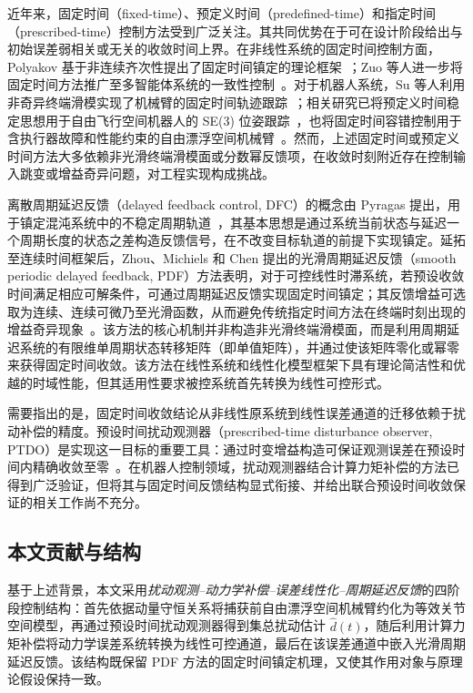 近年来，固定时间（fixed-time）、预定义时间（predefined-time）和指定时间（prescribed-time）控制方法受到广泛关注。其共同优势在于可在设计阶段给出与初始误差弱相关或无关的收敛时间上界。在非线性系统的固定时间控制方面，Polyakov 基于非连续齐次性提出了固定时间镇定的理论框架~\cite{polyakov2012}；Zuo 等人进一步将固定时间方法推广至多智能体系统的一致性控制~\cite{zuo2019}。对于机器人系统，Su 等人利用非奇异终端滑模实现了机械臂的固定时间轨迹跟踪~\cite{su2020}；相关研究已将预定义时间稳定思想用于自由飞行空间机器人的 SE(3) 位姿跟踪~\cite{xuPredefinedTimeTrackingControl2024}，也将固定时间容错控制用于含执行器故障和性能约束的自由漂浮空间机械臂~\cite{li2025}。然而，上述固定时间或预定义时间方法大多依赖非光滑终端滑模面或分数幂反馈项，在收敛时刻附近存在控制输入跳变或增益奇异问题，对工程实现构成挑战。

离散周期延迟反馈（delayed feedback control, DFC）的概念由 Pyragas 提出，用于镇定混沌系统中的不稳定周期轨道~\cite{pyragas1992}，其基本思想是通过系统当前状态与延迟一个周期长度的状态之差构造反馈信号，在不改变目标轨道的前提下实现镇定。延拓至连续时间框架后，Zhou、Michiels 和 Chen 提出的光滑周期延迟反馈（smooth periodic delayed feedback, PDF）方法表明，对于可控线性时滞系统，若预设收敛时间满足相应可解条件，可通过周期延迟反馈实现固定时间镇定；其反馈增益可选取为连续、连续可微乃至光滑函数，从而避免传统指定时间方法在终端时刻出现的增益奇异现象~\cite{zhouFixedtimeStabilizationLinear2022}。该方法的核心机制并非构造非光滑终端滑模面，而是利用周期延迟系统的有限维单周期状态转移矩阵（即单值矩阵），并通过使该矩阵零化或幂零来获得固定时间收敛。该方法在线性系统和线性化模型框架下具有理论简洁性和优越的时域性能，但其适用性要求被控系统首先转换为线性可控形式。

需要指出的是，固定时间收敛结论从非线性原系统到线性误差通道的迁移依赖于扰动补偿的精度。预设时间扰动观测器（prescribed-time disturbance observer, PTDO）是实现这一目标的重要工具：通过时变增益构造可保证观测误差在预设时间内精确收敛至零~\cite{jiangPrescribedtimeDisturbanceObserver2024}。在机器人控制领域，扰动观测器结合计算力矩补偿的方法已得到广泛验证，但将其与固定时间反馈结构显式衔接、并给出联合预设时间收敛保证的相关工作尚不充分。

\subsection{本文贡献与结构}

基于上述背景，本文采用\emph{扰动观测--动力学补偿--误差线性化--周期延迟反馈}的四阶段控制结构：首先依据动量守恒关系将捕获前自由漂浮空间机械臂约化为等效关节空间模型，再通过预设时间扰动观测器得到集总扰动估计 \(\hat d(t)\)，随后利用计算力矩补偿将动力学误差系统转换为线性可控通道，最后在该误差通道中嵌入光滑周期延迟反馈。该结构既保留 PDF 方法的固定时间镇定机理，又使其作用对象与原理论假设保持一致。

